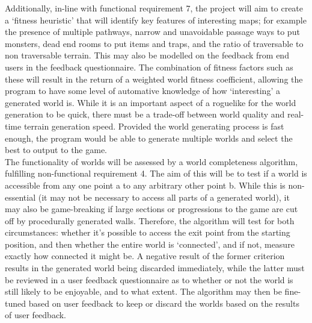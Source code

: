 \documentclass[12pt,a4paper]{article}
\begin{document}
Additionally, in-line with functional requirement 7, the project will aim to create a `fitness heuristic' that will identify key features of interesting maps; for example the presence of multiple pathways, narrow and unavoidable passage ways to put monsters, dead end rooms to put items and traps, and the ratio of traversable to non traversable terrain. This may also be modelled on the feedback from end users in the feedback questionnaire. The combination of fitness factors such as these will result in the return of a weighted world fitness coefficient, allowing the program to have some level of automative knowledge of how `interesting' a generated world is. While it is an important aspect of a roguelike for the world generation to be quick, there must be a trade-off between world quality and real-time terrain generation speed. Provided the world generating process is fast enough, the program would be able to generate multiple worlds and select the best to output to the game. \\

The functionality of worlds will be assessed by a world completeness algorithm, fulfilling non-functional requirement 4. The aim of this will be to test if a world is accessible from any one point a to any arbitrary other point b. While this is non-essential (it may not be necessary to access all parts of a generated world), it may also be game-breaking if large sections or progressions to the game are cut off by procedurally generated walls. Therefore, the algorithm will test for both circumstances: whether it's possible to access the exit point from the starting position, and then whether the entire world is `connected', and if not, measure exactly how connected it might be. A negative result of the former criterion results in the generated world being discarded immediately, while the latter must be reviewed in a user feedback questionnaire as to whether or not the world is still likely to be enjoyable, and to what extent. The algorithm may then be fine-tuned based on user feedback to keep or discard the worlds based on the results of user feedback. 






\end{document}
